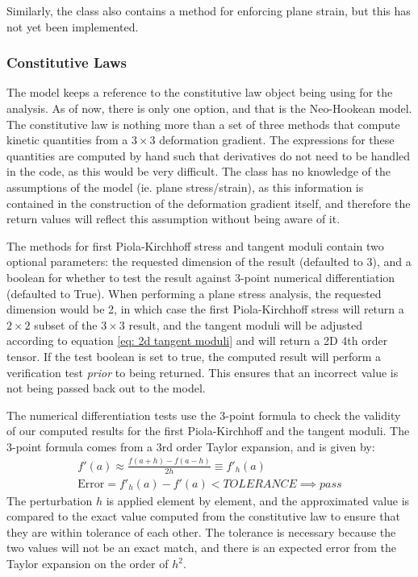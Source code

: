 \documentclass[]{spie}  %
\begin{document}
Similarly, the class also contains a method for enforcing plane strain, but this has not yet been implemented. 

\subsubsection{Constitutive Laws}
The model keeps a reference to the constitutive law object being using for the analysis. As of now, there is only one option, and that is the Neo-Hookean model. The constitutive law is nothing more than a set of three methods that compute kinetic quantities from a $3 \times 3$ deformation gradient. The expressions for these quantities are computed by hand such that derivatives do not need to be handled in the code, as this would be very difficult. The class has no knowledge of the assumptions of the model (ie. plane stress/strain), as this information is contained in the construction of the deformation gradient itself, and therefore the return values will reflect this assumption without being aware of it. 

The methods for first Piola-Kirchhoff stress and tangent moduli contain two optional parameters: the requested dimension of the result (defaulted to 3), and a boolean for whether to test the result against 3-point numerical differentiation (defaulted to True). When performing a plane stress analysis, the requested dimension would be 2, in which case the first Piola-Kirchhoff stress will return a $2 \times 2$ subset of the $3 \times 3$ result, and the tangent moduli will be adjusted according to equation \ref{eq: 2d tangent moduli} and will return a 2D 4th order tensor. If the test boolean is set to true, the computed result will perform a verification test \textit{prior} to being returned. This ensures that an incorrect value is not being passed back out to the model. 

The numerical differentiation tests use the 3-point formula to check the validity of our computed results for the first Piola-Kirchhoff and the tangent moduli. The 3-point formula comes from a 3rd order Taylor expansion, and is given by:
\begin{gather}
\label{eq: 3 point formula}
f'(a) \approx \frac{f(a + h) - f(a - h)}{2h} \equiv f'_h(a) \\[1ex]
\textrm{Error} = f'_h(a) - f'(a) < TOLERANCE \implies pass
\end{gather}
The perturbation $h$ is applied element by element, and the approximated value is compared to the exact value computed from the constitutive law to ensure that they are within tolerance of each other. The tolerance is necessary because the two values will not be an exact match, and there is an expected error from the Taylor expansion on the order of $h^2$. 
\end{document}

